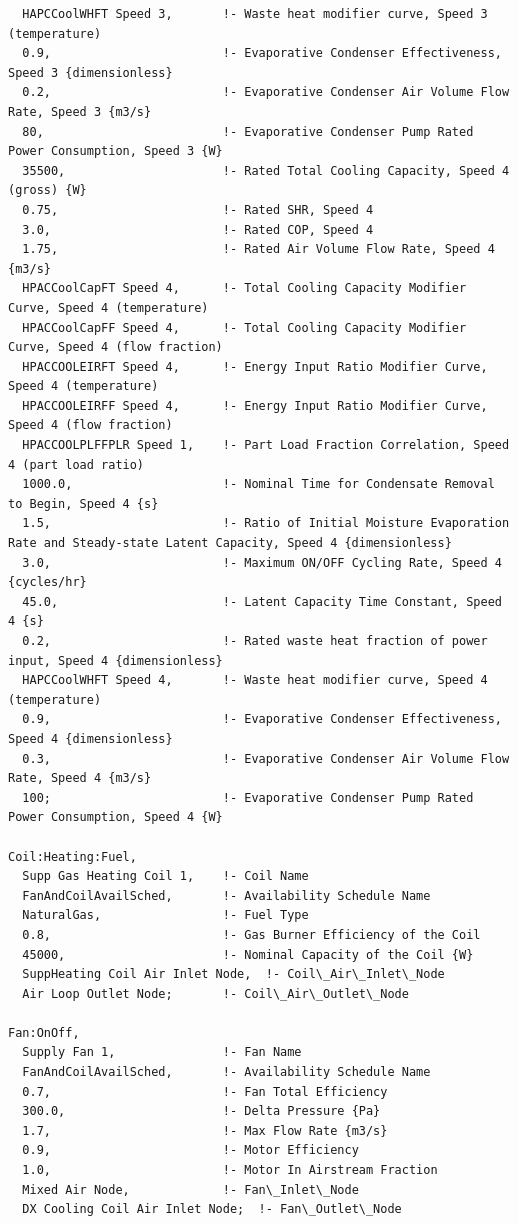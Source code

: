 \begin{lstlisting}
  HAPCCoolWHFT Speed 3,       !- Waste heat modifier curve, Speed 3 (temperature)
  0.9,                        !- Evaporative Condenser Effectiveness, Speed 3 {dimensionless}
  0.2,                        !- Evaporative Condenser Air Volume Flow Rate, Speed 3 {m3/s}
  80,                         !- Evaporative Condenser Pump Rated Power Consumption, Speed 3 {W}
  35500,                      !- Rated Total Cooling Capacity, Speed 4 (gross) {W}
  0.75,                       !- Rated SHR, Speed 4
  3.0,                        !- Rated COP, Speed 4
  1.75,                       !- Rated Air Volume Flow Rate, Speed 4 {m3/s}
  HPACCoolCapFT Speed 4,      !- Total Cooling Capacity Modifier Curve, Speed 4 (temperature)
  HPACCoolCapFF Speed 4,      !- Total Cooling Capacity Modifier Curve, Speed 4 (flow fraction)
  HPACCOOLEIRFT Speed 4,      !- Energy Input Ratio Modifier Curve, Speed 4 (temperature)
  HPACCOOLEIRFF Speed 4,      !- Energy Input Ratio Modifier Curve, Speed 4 (flow fraction)
  HPACCOOLPLFFPLR Speed 1,    !- Part Load Fraction Correlation, Speed 4 (part load ratio)
  1000.0,                     !- Nominal Time for Condensate Removal to Begin, Speed 4 {s}
  1.5,                        !- Ratio of Initial Moisture Evaporation Rate and Steady-state Latent Capacity, Speed 4 {dimensionless}
  3.0,                        !- Maximum ON/OFF Cycling Rate, Speed 4 {cycles/hr}
  45.0,                       !- Latent Capacity Time Constant, Speed 4 {s}
  0.2,                        !- Rated waste heat fraction of power input, Speed 4 {dimensionless}
  HAPCCoolWHFT Speed 4,       !- Waste heat modifier curve, Speed 4 (temperature)
  0.9,                        !- Evaporative Condenser Effectiveness, Speed 4 {dimensionless}
  0.3,                        !- Evaporative Condenser Air Volume Flow Rate, Speed 4 {m3/s}
  100;                        !- Evaporative Condenser Pump Rated Power Consumption, Speed 4 {W}

Coil:Heating:Fuel,
  Supp Gas Heating Coil 1,    !- Coil Name
  FanAndCoilAvailSched,       !- Availability Schedule Name
  NaturalGas,                 !- Fuel Type
  0.8,                        !- Gas Burner Efficiency of the Coil
  45000,                      !- Nominal Capacity of the Coil {W}
  SuppHeating Coil Air Inlet Node,  !- Coil\_Air\_Inlet\_Node
  Air Loop Outlet Node;       !- Coil\_Air\_Outlet\_Node

Fan:OnOff,
  Supply Fan 1,               !- Fan Name
  FanAndCoilAvailSched,       !- Availability Schedule Name
  0.7,                        !- Fan Total Efficiency
  300.0,                      !- Delta Pressure {Pa}
  1.7,                        !- Max Flow Rate {m3/s}
  0.9,                        !- Motor Efficiency
  1.0,                        !- Motor In Airstream Fraction
  Mixed Air Node,             !- Fan\_Inlet\_Node
  DX Cooling Coil Air Inlet Node;  !- Fan\_Outlet\_Node


\end{lstlisting}
